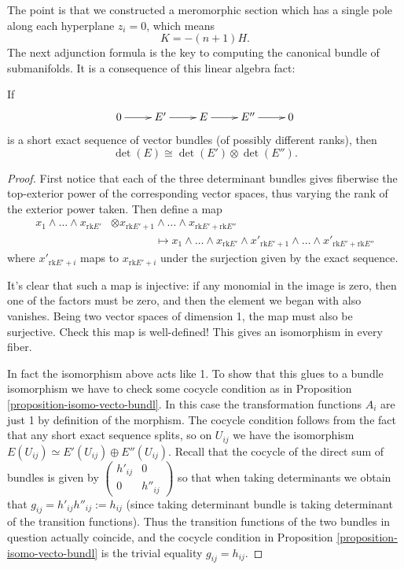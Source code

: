 The point is that we constructed a
meromorphic section which has
a single pole along each hyperplane $z_i=0$,
which means
$$
K=-(n+1)H.
$$
\medskip\noindent
The next adjunction formula is the key to
computing
the canonical bundle of submanifolds.
It is a consequence of this linear algebra
fact:

\begin{lemma}
\label{lemma-detrminant-of-ses}
If
$$
\xymatrix{
0\ar[r]
&E'\ar[r]
&E\ar[r]
&E''\ar[r]
&0
}
$$
is a short exact sequence of vector bundles
(of possibly different ranks),
then
$$
\det(E)\cong \det(E')\otimes \det(E'').
$$
\end{lemma}

\begin{proof}
First notice that each of the three
determinant bundles gives fiberwise the
top-exterior
power of the corresponding vector spaces,
thus varying the rank of the exterior power
taken.
Then define a map
$$
\begin{aligned}
x_1 \wedge…\wedge x_{\text{rk}E'}
&\otimes x_{\text{rk}E'+1}\wedge…\wedge
x_{\text{rk}E'+\text{rk}E''}\\
&\qquad \qquad \mapsto x_1 \wedge…\wedge
x_{\text{rk}E'}
\wedge x'_{\text{rk}E'+1}\wedge…\wedge
x'_{\text{rk}E'+\text{rk}E''}
\end{aligned}
$$
where $x'_{\text{rk}E'+i}$ maps to
$x_{\text{rk}E'+i}$
under the surjection given by the exact
sequence.

It's clear that such a map is injective:
if any monomial in the image is zero, then
one of the
factors must be zero, and then the element
we began with also vanishes.
Being two vector spaces of dimension 1,
the map must also be surjective.
Check this map is well-defined!
This gives an isomorphism in every fiber.

In fact the isomorphism above acts like 1.
To show that this glues to a bundle
isomorphism
we have to check some cocycle condition
as in Proposition
\ref{proposition-isomo-vecto-bundl}.
In this case the transformation functions
$A_i$
are just 1 by definition of the morphism.
The cocycle condition follows from the fact
that
any short exact sequence splits,
so on $U_{ij}$ we have the isomorphism
$E(U_{ij}) \simeq E'(U_{ij})\oplus
E''(U_{ij})$.
Recall that the cocycle of the direct sum of
bundles is given by
$\begin{pmatrix}h'_{ij}&0\\
0&h''_{ij}\end{pmatrix}$
so that when taking determinants
we obtain that
$g_{ij}=h'_{ij}h''_{ij}:=h_{ij}$
(since taking determinant bundle is taking
determinant of
the transition functions).
Thus the transition functions of the two
bundles in question
actually coincide,
and the cocycle condition in Proposition
\ref{proposition-isomo-vecto-bundl}
is the trivial equality $g_{ij}=h_{ij}$.
\end{proof}

